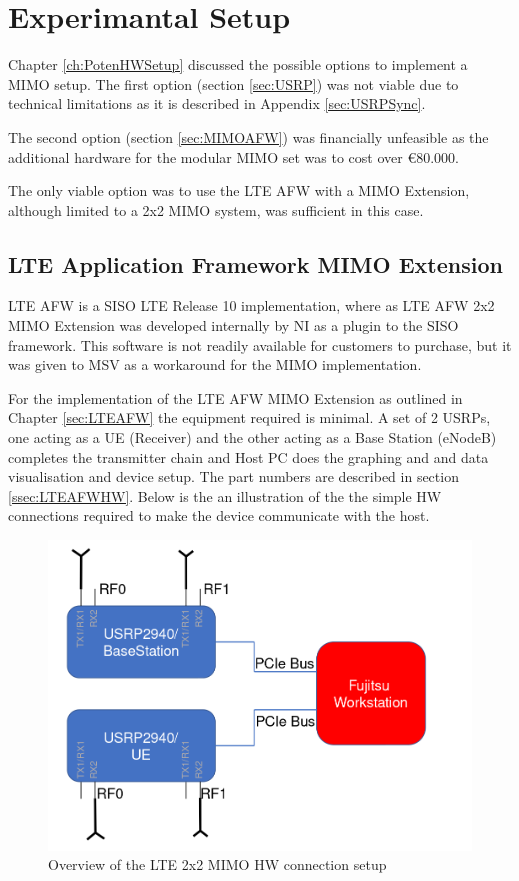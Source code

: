 \chapter{Experimantal Setup}
\label{ch:ExSetup}

Chapter \ref{ch:PotenHWSetup} discussed the possible options to implement a MIMO setup. The first option (section \ref{sec:USRP}) was not viable due to technical limitations as it is described in Appendix \ref{sec:USRPSync}.

The second option (section \ref{sec:MIMOAFW}) was financially unfeasible as the additional hardware for the modular MIMO set was to cost over €80.000.

The only viable option was to use the LTE AFW with a MIMO Extension, although limited to a 2x2 MIMO system, was sufficient in this case.

\section{LTE Application Framework MIMO Extension}\label{sec:LTEAFWMIMOExt}

LTE AFW is a SISO LTE Release 10 implementation, where as LTE AFW 2x2 MIMO Extension was developed internally by NI as a plugin to the SISO framework. This software is not readily available for customers to purchase, but it was given to MSV as a workaround for the MIMO implementation.

For the implementation of the LTE AFW MIMO Extension as outlined in Chapter \ref{sec:LTEAFW} the equipment required is minimal. A set of 2 USRPs, one acting as a UE (Receiver) and the other acting as a Base Station (eNodeB) completes the transmitter chain and Host PC does the graphing and and data visualisation and device setup. The part numbers are described in section \ref{ssec:LTEAFWHW}. Below is the an illustration of the the simple HW connections required to make the device communicate with the host.

\begin{figure}[H]
\centering
\includegraphics[width=\linewidth]{images/MIMOSetUpArrangement.png}
\caption{Overview of the LTE 2x2 MIMO HW connection setup}
\label{fig:LTEAFWHWSetup}
\end{figure}

